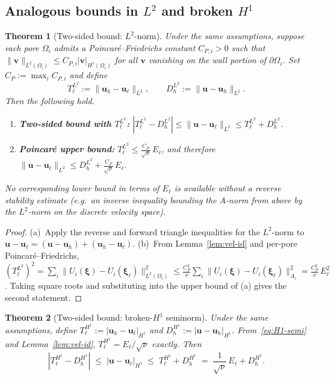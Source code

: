 \documentclass[11pt,a4paper]{article}
\newtheorem{theorem}{Theorem}[section]
\theoremstyle{definition}
\newcommand{\pore}[1]{\Omega_{#1}}
\newcommand{\vel}{\bm{u}}
\begin{document}
\subsection{Analogous bounds in $L^2$ and broken $H^1$}

\begin{theorem}[Two-sided bound: $L^2$-norm]\label{thm:sep-L2}
  Under the same assumptions, suppose each pore $\pore{i}$ admits a
  Poincar\'e--Friedrichs constant $C_{P,i}>0$ such that
  $\|\bm{v}\|_{L^2(\pore{i})} \le C_{P,i}|\bm{v}|_{H^1(\pore{i})}$
  for all $\bm{v}$ vanishing on the wall portion of
  $\partial\pore{i}$.  Set $C_P := \max_i C_{P,i}$ and define
  \begin{equation}\label{eq:TL2}
    T_\ell^{L^2} := \|\vel_h - \vel_\ell\|_{L^2},\qquad
    D_h^{L^2} := \|\vel - \vel_h\|_{L^2}.
  \end{equation}
  Then the following hold.
  \begin{enumerate}[label=(\alph*),nosep,leftmargin=*]
    \item \textbf{Two-sided bound with $T_\ell^{L^2}$:}
      $|T_\ell^{L^2} - D_h^{L^2}|
       \le \|\vel - \vel_\ell\|_{L^2}
       \le T_\ell^{L^2} + D_h^{L^2}$.
    \item \textbf{Poincar\'e upper bound:}
      $T_\ell^{L^2} \le \frac{C_P}{\sqrt{\nu}}\,E_\ell$, and therefore
      $\|\vel - \vel_\ell\|_{L^2}
       \le D_h^{L^2} + \frac{C_P}{\sqrt{\nu}}\,E_\ell$.
  \end{enumerate}
  No corresponding lower bound in terms of $E_\ell$ is available without
  a reverse stability estimate (e.g.\ an inverse inequality bounding
  the $A$-norm from above by the $L^2$-norm on the discrete velocity
  space).
\end{theorem}

\begin{proof}
  (a)~Apply the reverse and forward triangle inequalities for the
  $L^2$-norm to $\vel-\vel_\ell = (\vel-\vel_h) + (\vel_h-\vel_\ell)$.
  (b)~From Lemma~\ref{lem:vel-id} and per-pore Poincar\'e--Friedrichs,
  $(T_\ell^{L^2})^2
   = \sum_i \|U_i(\bm{\xi})-U_i(\bm{\xi}_\ell)\|_{L^2(\pore{i})}^2
   \le \frac{C_P^2}{\nu}\sum_i \|U_i(\bm{\xi})-U_i(\bm{\xi}_\ell)\|_{A_i}^2
   = \frac{C_P^2}{\nu}\,E_\ell^2$.
  Taking square roots and substituting into the upper bound of (a)
  gives the second statement.
\end{proof}

\begin{theorem}[Two-sided bound: broken-$H^1$ seminorm]\label{thm:sep-H1}
  Under the same assumptions, define
  $T_\ell^{H^1} := |\vel_h - \vel_\ell|_{H^1}$ and
  $D_h^{H^1} := |\vel - \vel_h|_{H^1}$.
  From~\eqref{eq:H1-semi} and Lemma~\ref{lem:vel-id},
  $T_\ell^{H^1} = E_\ell/\sqrt{\nu}$ exactly.
  Then
  \begin{equation}\label{eq:sep-H1}
    |T_\ell^{H^1} - D_h^{H^1}|
    \;\le\; |\vel - \vel_\ell|_{H^1}
    \;\le\; T_\ell^{H^1} + D_h^{H^1}
    \;=\; \frac{1}{\sqrt{\nu}}\,E_\ell + D_h^{H^1}.
  \end{equation}
\end{theorem}
\end{document}
